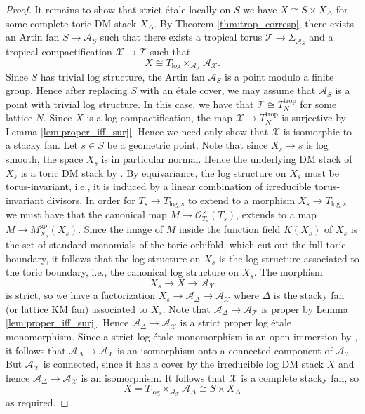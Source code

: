 \documentclass[11pt]{amsart}
\theoremstyle{definition}
\theoremstyle{remark}
\def\log{\mathrm{log}}
\def\gp{\mathrm{gp}}
\def\trop{\mathrm{trop}}
\begin{document}
\begin{proof}
	It remains to show that strict étale locally on $S$ we have
	$X\cong S\times X_{\Delta}$ for some complete toric DM stack $X_{\Delta}$.
	By Theorem \ref{thm:trop_corresp}, there exists an Artin fan
	$S\to \mathcal{A}_{S}$ such that there exists a tropical
	torus $\mathcal{T}\to \Sigma_{\mathcal{A}_S}$ and a tropical compactification
	$\mathcal{X}\to \mathcal{T}$ such that
	$$X\cong T_{\log}\times_{\mathcal{A}_{\mathcal{T}}}\mathcal{A}_{\mathcal{X}}.$$
	Since $S$ has trivial log structure, the Artin fan $\mathcal{A}_{S}$
	is a point modulo a finite group. Hence after replacing $S$
	with an étale cover, we may assume that $\mathcal{A}_S$ is a point
	with trivial log structure. In this case, we have that $\mathcal{T}\cong T_N^{\trop}$
	for some lattice $N$. Since $X$ is a log compactification, the map $\mathcal{X}\to T_N^{\trop}$
	is surjective by Lemma \ref{lem:proper_iff_surj}. Hence we need only show that $\mathcal{X}$ is
	isomorphic to a stacky fan. Let $s\in S$ be a geometric point. Note that since $X_s\to s$ is log smooth,
	the space $X_s$ is in particular normal. Hence the underlying DM stack of $X_s$ is a toric DM stack by \cite[Definition 3.10.1]{ATheoryOfStaGillam2015}.
	By equivariance, the log structure on $X_s$ must be torus-invariant, i.e., it is induced by a linear combination
	of irreducible torus-invariant divisors. In order for $T_s\to T_{\log,s}$ to extend to a morphism $X_s\to T_{\log,s}$
	we must have that the canonical map $M\to \mathcal{O}_{T_s}^{\times}(T_s)$, extends to a map $M\to M_{X_s}^{\gp}(X_s)$.
	Since the image of $M$
	inside the function field $K(X_s)$ of $X_s$ is the set of standard monomials of the toric orbifold, which cut out the full toric boundary, it follows
	that the log structure on $X_s$ is the log structure associated to the toric boundary, i.e., the canonical log structure on
	$X_s$. The morphism
	$$X_s\to X\to \mathcal{A}_{\mathcal{X}}$$
	is strict, so we have a factorization
	$X_s\to \mathcal{A}_{\Delta}\to \mathcal{A}_{\mathcal{X}}$ where $\Delta$ is the stacky fan (or lattice KM fan) associated
	to $X_s$. Note that $\mathcal{A}_{\Delta}\to \mathcal{A}_{\mathcal{T}}$ is proper by Lemma \ref{lem:proper_iff_surj}.
	Hence $\mathcal{A}_{\Delta}\to \mathcal{A}_{\mathcal{X}}$ is a strict proper log étale monomorphism. Since a strict log étale
	monomorphism is an open immersion by \cite[025G]{stacks-project}, it follows that $\mathcal{A}_{\Delta}\to \mathcal{A}_{\mathcal{X}}$
	is an isomorphism onto a connected component of $\mathcal{A}_{\mathcal{X}}$. But $\mathcal{A}_{\mathcal{X}}$ is connected, since it has
	a cover by the irreducible log DM stack $X$ and hence $\mathcal{A}_{\Delta}\to \mathcal{A}_{\mathcal{X}}$ is an isomorphism.
	It follows that $\mathcal{X}$ is a complete stacky fan, so
	$$X=T_{\log}\times_{\mathcal{A}_{\mathcal{T}}}\mathcal{A}_{\Delta}\cong S\times X_{\Delta}$$
	as required.
\end{proof}
\end{document}
